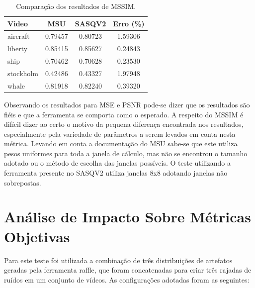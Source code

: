 \begin{table}[!htb]
	\centering
	\caption{Comparação dos resultados de MSSIM.}
	\label{res:mssim}
	\begin{tabular}{lccc}
	\hline
	Video	 & MSU	 & SASQV2	 & Erro (\%) \\ \hline
	aircraft	 & 0.79457 & 0.80723 & 1.59306	 \\
	liberty	 & 0.85415 & 0.85627 & 0.24843	 \\
	ship	 & 0.70462 & 0.70628 & 0.23530	 \\ 
	stockholm & 0.42486 & 0.43327 & 1.97948	 \\ 
	whale	 & 0.81918 & 0.82240 & 0.39320	 \\
	\hline
	\end{tabular}
\end{table}

Observando os resultados para MSE e PSNR pode-se dizer que os resultados são fiéis e que a ferramenta se comporta como o esperado.
A respeito do MSSIM é difícil dizer ao certo o motivo da pequena diferença encontrada nos resultados, especialmente pela variedade de parâmetros a serem levados em conta nesta métrica. 
Levando em conta a documentação do MSU sabe-se que este utiliza pesos uniformes para toda a janela de cálculo, mas não se encontrou o tamanho adotado ou o método de escolha das janelas possíveis.
O teste utilizando a ferramenta presente no SASQV2 utiliza janelas 8x8 adotando janelas não sobrepostas.

\section{Análise de Impacto Sobre Métricas Objetivas}



Para este teste foi utilizada a combinação de três distribuições de artefatos geradas pela ferramenta raffle, que foram concatenadas para criar três rajadas de ruídos em um conjunto de vídeos. As configurações adotadas foram as seguintes:

